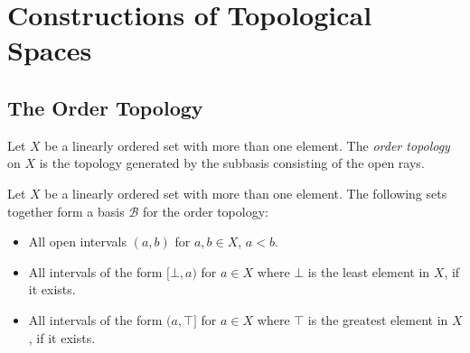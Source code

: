 \chapter{Constructions of Topological Spaces}

\section{The Order Topology}

\begin{df}
  Let $X$ be a linearly ordered set with more than one element. The \emph{order topology} on $X$ is the topology generated by the subbasis consisting of the open rays.
\end{df}

\begin{prop}
  \label{prop:order:topology}
  Let $X$ be a linearly ordered set with more than one element. The following sets together form a basis $\mathcal{B}$ for the order topology:
  \begin{itemize}
    \item
    All open intervals $(a,b)$ for $a, b \in X$, $a < b$.
    \item
    All intervals of the form $[\bot, a)$ for $a \in X$ where $\bot$ is the least element in $X$, if it exists.
    \item
    All intervals of the form $(a, \top]$ for $a \in X$ where $\top$ is the greatest element in $X$, if it exists.
  \end{itemize}
\end{prop}

